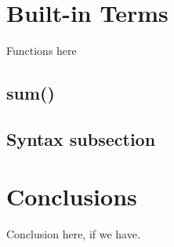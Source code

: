 \documentclass[prodmode,acmtecs]{acmsmall}
\begin{document}
\section{Built-in Terms}
Functions here

\subsection{sum()}

\subsection{Syntax subsection}

\section{Conclusions}

Conclusion here, if we have.




%
%



\medskip

\end{document}

